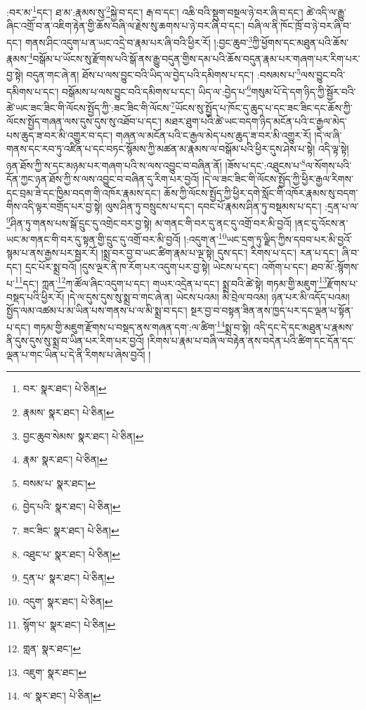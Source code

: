 :བར་མ་\footnote{བར་  སྣར་ཐང་།  པེ་ཅིན། }དང་། ཐ་མ་:རྣམས་སུ་\footnote{རྣམས་  སྣར་ཐང་།  པེ་ཅིན། }སྐྱེ་བ་དང་། རྒ་བ་དང་། འཆི་བའི་སྡུག་བསྔལ་ཉེ་བར་ཞི་བ་དང་། ཚེ་འདི་ལ་རྒྱུ་ཞིང་འགྲོ་བ་ན་འཇིག་རྟེན་གྱི་ཆོས་བཞི་ལ་རྗེས་སུ་ཆགས་པ་ཉེ་བར་ཞི་བ་དང་། བཞི་ལ་ནི་ཁོང་ཁྲོ་བ་ཉེ་བར་ཞི་བ་དང་། གནས་ཤིང་འདུག་པ་ན་ཡང་འདྲེ་བ་རྣམ་པར་ཞི་བའི་ཕྱིར་རོ། །:བྱང་ཆུབ་\footnote{བྱང་ཆུབ་སེམས་  སྣར་ཐང་།  པེ་ཅིན། }ཀྱི་ཕྱོགས་དང་མཐུན་པའི་ཆོས་རྣམས་\footnote{རྣམ་  སྣར་ཐང་།  པེ་ཅིན། }བསྒོམ་པ་ཡོངས་སུ་རྫོགས་པའི་སྒོ་ནས་རྒྱུ་བདུན་གྱིས་དམ་པའི་ཆོས་བདུན་རྣམ་པར་གཞག་པར་རིག་པར་བྱ་སྟེ། བདུན་གང་ཞེ་ན། ཐོས་པ་ལས་བྱུང་བའི་ཡིད་ལ་བྱེད་པའི་དམིགས་པ་དང་། :བསམས་པ་\footnote{བསམ་པ་  སྣར་ཐང་། }ལས་བྱུང་བའི་དམིགས་པ་དང་། བསྒོམས་པ་ལས་བྱུང་བའི་དམིགས་པ་དང་། ཡིད་ལ་:བྱེད་པ་\footnote{བྱེད་པའི་  སྣར་ཐང་།  པེ་ཅིན། }གསུམ་པོ་དེ་དག་ཉིད་ཀྱི་སྦྱོར་བའི་ཚེ་ཡང་ཟང་ཟིང་གི་ལོངས་སྤྱོད་ཀྱི་:ཟང་ཟིང་གི་ལོངས་\footnote{ཟང་ཟིང་  སྣར་ཐང་།  པེ་ཅིན། }ཡོངས་སུ་སྤྱོད་པ་ཁོང་དུ་ཆུད་པ་དང་ཟང་ཟིང་དང་ཆོས་ཀྱི་ལོངས་སྤྱོད་གཞན་ལས་དུས་དུས་སུ་འཐོབ་པ་དང་། མཐར་ཐུག་པའི་ཚེ་ཡང་བདག་ཉིད་མངོན་པའི་ང་རྒྱལ་མེད་པས་ཆུད་ཟ་བར་མི་འགྱུར་བ་དང་། གཞན་ལ་མངོན་པའི་ང་རྒྱལ་མེད་པས་ཆུད་ཟ་བར་མི་འགྱུར་རོ། །དེ་ལ་ཞི་གནས་དང་རབ་ཏུ་འཛིན་པ་དང་བཏང་སྙོམས་ཀྱི་མཚན་མ་རྣམས་ལ་བསྒོམ་པའི་ཕྱིར་དུས་ཤེས་པ་སྟེ། འདི་ལྟ་སྟེ། ཉན་ཐོས་ཀྱི་ས་དང་མཉམ་པར་གཞག་པའི་ས་ལས་འབྱུང་བ་བཞིན་ནོ། །ཟོས་པ་དང་:འཐུངས་པ་\footnote{འཐུང་པ་  སྣར་ཐང་།  པེ་ཅིན། }ལ་སོགས་པའི་དོན་ཀྱང་ཉན་ཐོས་ཀྱི་ས་ལས་འབྱུང་བ་བཞིན་དུ་རིག་པར་བྱའོ། །དེ་ལ་ཟང་ཟིང་གི་ལོངས་སྤྱོད་ཀྱི་ཕྱིར་རྒྱལ་རིགས་དང་བྲམ་ཟེ་དང་ཁྱིམ་བདག་གི་འཁོར་རྣམས་དང་། ཆོས་ཀྱི་ལོངས་སྤྱོད་ཀྱི་ཕྱིར་དགེ་སློང་གི་འཁོར་རྣམས་སུ་བདག་གིས་འདི་ལྟར་བགྲོད་པར་བྱ་སྟེ། ལུས་ཤིན་ཏུ་བསྲུངས་པ་དང་། དབང་པོ་རྣམས་ཤིན་ཏུ་བསྡམས་པ་དང་། :དྲན་པ་ལ་\footnote{དྲན་པ་  སྣར་ཐང་།  པེ་ཅིན། }ཤིན་ཏུ་གནས་པས་སྒོ་དྲུང་དུ་འགྲེང་བར་བྱ་སྟེ། མ་གནང་གི་བར་དུ་ནང་དུ་འགྲོ་བར་མི་བྱའོ། །ནང་དུ་འོངས་ན་ཡང་མ་གནང་གི་བར་དུ་སྟན་གྱི་དྲུང་དུ་འགྲོ་བར་མི་བྱའོ། །:འདུག་ན་\footnote{འདུག་  སྣར་ཐང་།  པེ་ཅིན། }ཡང་དྲག་ཏུ་ལྗིད་ཀྱིས་དབབ་པར་མི་བྱའོ་སྙམ་པ་ནས་རྒྱས་པར་སྦྱར་རོ། །སྨྲ་བར་བྱ་བ་ཡང་ཚིག་རྣམ་པ་ལྔ་སྟེ། དུས་དང་། རིགས་པ་དང་། རན་པ་དང་། ཞི་བ་དང་། དྲང་པོར་སྨྲ་བའོ། །དུས་ལྔར་ནི་ཁ་རོག་པར་འདུག་པར་བྱ་སྟེ། ཡེངས་པ་དང་། འགོག་པ་དང་། ཐབ་མོ་:སྙོགས་པ་\footnote{སྙོག་པ་  སྣར་ཐང་།  པེ་ཅིན། }དང་། ཀླན་\footnote{གླན་  སྣར་ཐང་། }ཀ་ཚོལ་ཞིང་འདུག་པ་དང་། གཡར་འདྲེན་པ་དང་། སྨྲ་བའི་ཚེ་སྟེ། གཏམ་གྱི་མཇུག་\footnote{འཇུག་  སྣར་ཐང་། }རྫོགས་པ་བསྡད་པའི་ཕྱིར་རོ། །དེ་ལ་དུས་དུས་སུ་སྨྲ་བ་གང་ཞེ་ན། ཡེངས་པའམ། མི་བྲེལ་བའམ། ཉན་པར་མི་འདོད་པའམ། སྤྱོད་ལམ་འཚམ་པ་མ་ཡིན་པས་གནས་པ་ལ་མི་སྨྲ་བ་དང་། སྔར་བྱ་བ་བསྟན་ཟིན་ནས་ཁྱད་པར་དང་ལྡན་པ་སྟོན་པ་དང་། གཏམ་གྱི་མཇུག་རྫོགས་པ་བསྡད་ནས་གཞན་དག་:ལ་ཚིག་\footnote{ལ་  སྣར་ཐང་།  པེ་ཅིན། }སྨྲ་བ་སྟེ། འདི་དང་དེ་དང་མཐུན་པ་རྣམས་ནི་དུས་དུས་སུ་སྨྲ་བ་ཡིན་པར་རིག་པར་བྱའོ། །རིགས་པ་རྣམ་པ་བཞི་ལ་བརྟེན་ནས་བདེན་པའི་ཚིག་དང་དོན་དང་ལྡན་པ་གང་ཡིན་པ་དེ་ནི་རིགས་པ་ཞེས་བྱའོ། །

